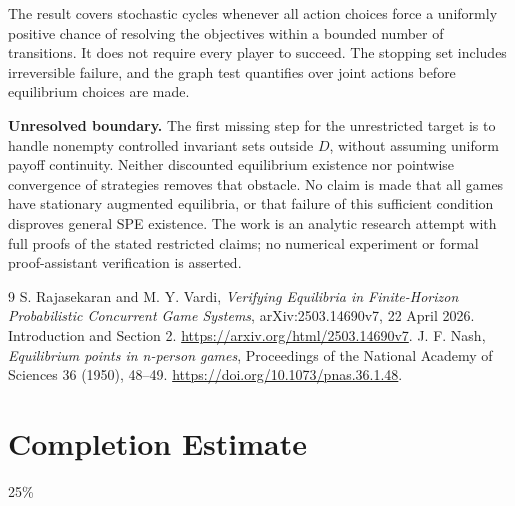 \documentclass[11pt]{article}
\theoremstyle{remark}\newtheorem{remark}[theorem]{Remark}
\begin{document}
The result covers stochastic cycles whenever all action choices force a uniformly positive chance of resolving the objectives within a bounded number of transitions. It does not require every player to succeed. The stopping set includes irreversible failure, and the graph test quantifies over joint actions before equilibrium choices are made.

\textbf{Unresolved boundary.} The first missing step for the unrestricted target is to handle nonempty controlled invariant sets outside $D$, without assuming uniform payoff continuity. Neither discounted equilibrium existence nor pointwise convergence of strategies removes that obstacle. No claim is made that all games have stationary augmented equilibria, or that failure of this sufficient condition disproves general SPE existence. The work is an analytic research attempt with full proofs of the stated restricted claims; no numerical experiment or formal proof-assistant verification is asserted.

\begin{thebibliography}{9}
 S. Rajasekaran and M. Y. Vardi, \emph{Verifying Equilibria in Finite-Horizon Probabilistic Concurrent Game Systems}, arXiv:2503.14690v7, 22 April 2026. Introduction and Section 2. \url{https://arxiv.org/html/2503.14690v7}.
 J. F. Nash, \emph{Equilibrium points in n-person games}, Proceedings of the National Academy of Sciences 36 (1950), 48--49. \url{https://doi.org/10.1073/pnas.36.1.48}.
\end{thebibliography}

\section{Completion Estimate}
25\%
\end{document}
